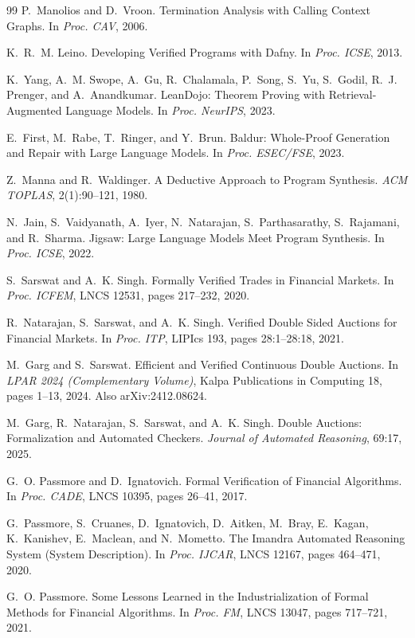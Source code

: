 \documentclass[11pt,a4paper]{article}
\begin{document}
\begin{thebibliography}{99}
P.~Manolios and D.~Vroon.
Termination Analysis with Calling Context Graphs.
In \emph{Proc. CAV}, 2006.

K.~R.~M. Leino.
Developing Verified Programs with Dafny.
In \emph{Proc. ICSE}, 2013.

K.~Yang, A.~M. Swope, A.~Gu, R.~Chalamala, P.~Song, S.~Yu, S.~Godil,
R.~J. Prenger, and A.~Anandkumar.
LeanDojo: Theorem Proving with Retrieval-Augmented Language Models.
In \emph{Proc. NeurIPS}, 2023.

E.~First, M.~Rabe, T.~Ringer, and Y.~Brun.
Baldur: Whole-Proof Generation and Repair with Large Language Models.
In \emph{Proc. ESEC/FSE}, 2023.

Z.~Manna and R.~Waldinger.
A Deductive Approach to Program Synthesis.
\emph{ACM TOPLAS}, 2(1):90--121, 1980.

N.~Jain, S.~Vaidyanath, A.~Iyer, N.~Natarajan, S.~Parthasarathy,
S.~Rajamani, and R.~Sharma.
Jigsaw: Large Language Models Meet Program Synthesis.
In \emph{Proc. ICSE}, 2022.

S.~Sarswat and A.~K. Singh.
Formally Verified Trades in Financial Markets.
In \emph{Proc. ICFEM}, LNCS 12531, pages 217--232, 2020.

R.~Natarajan, S.~Sarswat, and A.~K. Singh.
Verified Double Sided Auctions for Financial Markets.
In \emph{Proc. ITP}, LIPIcs 193, pages 28:1--28:18, 2021.

M.~Garg and S.~Sarswat.
Efficient and Verified Continuous Double Auctions.
In \emph{LPAR 2024 (Complementary Volume)}, Kalpa Publications in
Computing 18, pages 1--13, 2024. Also arXiv:2412.08624.

M.~Garg, R.~Natarajan, S.~Sarswat, and A.~K. Singh.
Double Auctions: Formalization and Automated Checkers.
\emph{Journal of Automated Reasoning}, 69:17, 2025.

G.~O. Passmore and D.~Ignatovich.
Formal Verification of Financial Algorithms.
In \emph{Proc. CADE}, LNCS 10395, pages 26--41, 2017.

G.~Passmore, S.~Cruanes, D.~Ignatovich, D.~Aitken, M.~Bray, E.~Kagan,
K.~Kanishev, E.~Maclean, and N.~Mometto.
The Imandra Automated Reasoning System (System Description).
In \emph{Proc. IJCAR}, LNCS 12167, pages 464--471, 2020.

G.~O. Passmore.
Some Lessons Learned in the Industrialization of Formal Methods for
Financial Algorithms.
In \emph{Proc. FM}, LNCS 13047, pages 717--721, 2021.


\end{thebibliography}
\end{document}
